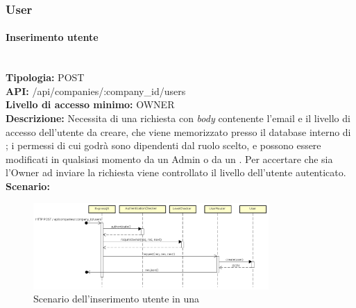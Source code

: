 \newpage
\subsubsection{User}

\paragraph{Inserimento utente}\mbox{}\\
\textbf{Tipologia:} POST \\
\textbf{API:} /api/companies/:company\_id/users \\
\textbf{Livello di accesso minimo:} OWNER \\
\textbf{Descrizione:} Necessita di una richiesta con \textit{body} contenente l'email e il livello di accesso dell'utente da creare, che viene memorizzato presso il database interno di ; i permessi di cui godrà sono dipendenti dal ruolo scelto, e possono essere modificati in qualsiasi momento da un Admin o da un . Per accertare che sia l'Owner ad inviare la richiesta viene controllato il livello dell'utente autenticato. \\
\textbf{Scenario:} 
\begin{figure}[H]
\centering
\includegraphics[width=0.8\textwidth]{res/sections/backend/sequence/(POST)user.png}
\caption{Scenario dell'inserimento utente in una }
\end{figure}

\newpage

